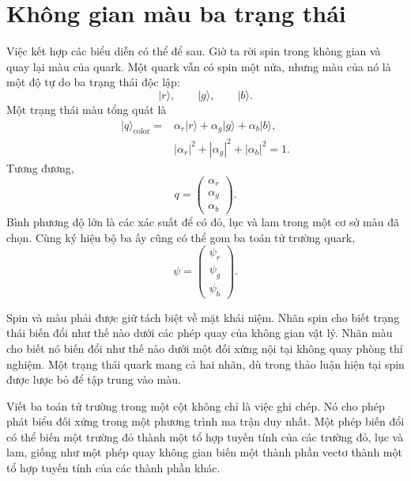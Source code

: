 \section{Không gian màu ba trạng thái}

Việc kết hợp các biểu diễn có thể để sau. Giờ ta rời spin trong không gian và quay lại
màu của quark. Một quark vẫn có spin một nửa, nhưng màu của nó là một
độ tự do ba trạng thái độc lập:
\begin{equation}
\lvert r\rangle,\qquad
\lvert g\rangle,\qquad
\lvert b\rangle.
\end{equation}
Một trạng thái màu tổng quát là
\begin{equation}
\begin{aligned}
\lvert q\rangle_{\mathrm{color}}
={}&
\alpha_r\lvert r\rangle
+\alpha_g\lvert g\rangle
+\alpha_b\lvert b\rangle,
\\
&|\alpha_r|^2+|\alpha_g|^2+|\alpha_b|^2=1.
\end{aligned}
\end{equation}
Tương đương,
\begin{equation}
q=
\begin{pmatrix}
\alpha_r\\
\alpha_g\\
\alpha_b
\end{pmatrix}.
\end{equation}
Bình phương độ lớn là các xác suất để có đỏ, lục và lam trong một
cơ sở màu đã chọn. Cùng ký hiệu bộ ba ấy cũng có thể gom ba toán tử trường quark,
\begin{equation}
\psi=
\begin{pmatrix}
\psi_r\\
\psi_g\\
\psi_b
\end{pmatrix}.
\end{equation}

Spin và màu phải được giữ tách biệt về mặt khái niệm. Nhãn spin cho biết trạng thái
biến đổi như thế nào dưới các phép quay của không gian vật lý. Nhãn màu cho biết
nó biến đổi như thế nào dưới một đối xứng nội tại không quay phòng thí nghiệm.
Một trạng thái quark mang cả hai nhãn, dù trong thảo luận hiện tại spin được
lược bỏ để tập trung vào màu.

Viết ba toán tử trường trong một cột không chỉ là việc ghi chép. Nó cho phép
phát biểu đối xứng trong một phương trình ma trận duy nhất. Một phép biến đổi
có thể biến một trường đỏ thành một tổ hợp tuyến tính của các trường đỏ, lục và lam,
giống như một phép quay không gian biến một thành phần vectơ thành một tổ hợp tuyến
tính của các thành phần khác.

